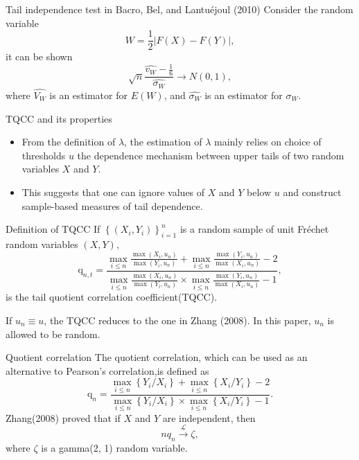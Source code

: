 \documentclass[12pt]{beamer}
\begin{document}
\begin{frame}{Tail independence test in Bacro, Bel, and Lantuéjoul (2010)}
Consider the random variable 
\begin{displaymath}
W=\frac{1}{2}|F(X)-F(Y)|,
\end{displaymath}
it can be shown
$$\sqrt{n} \frac{\widehat{v_{W}}-\frac{1}{6}}{\widehat{\sigma_{W}}}\rightarrow  N(0,1),$$
where $\widehat{V_W}$ is an estimator for $E(W)$, and 
$\widehat{\sigma_W}$ is an estimator for $\sigma_W$. 
\end{frame}

\begin{frame}{TQCC and its properties}
\begin{itemize}
\item From the definition of $\lambda$, the estimation of $\lambda$ mainly relies on choice of thresholds $u$ the dependence mechanism between upper tails of
two random variables $X$ and $Y$.
\vspace{3ex}
\item This suggests that one can ignore values of $X$ and $Y$ below $u$ and construct sample-based measures of tail dependence.
\end{itemize}

\end{frame}


\begin{frame}{Definition of TQCC}
If $\left\{\left(X_{i}, Y_{i}\right)\right\}_{i=1}^{n}$ is a random sample of unit Fréchet random variables $(X,Y)$,
\begin{displaymath}
\mathrm{q}_{n, t}=\frac{\max _{i \leq n} \frac{\max \left(X_{i}, u_n\right)}{\max \left(Y_{i},u_n\right)}+\max _{i \leq n} \frac{\max \left(Y_{i}, u_n\right)}{\max \left(X_{i}, u_n\right)}-2}{\max _{i \leq n} \frac{\max \left(X_{i},u_n\right)}{\max \left(Y_{i}, u_n\right)} \times \max _{i \leq n} \frac{\max \left(Y_{i}, u_n\right)}{\max \left(X_{i}, u_n\right)}-1},
\end{displaymath}
is the tail quotient correlation coefficient(TQCC).

If $u_{n} \equiv u$, the TQCC reduces to the one in Zhang (2008). In this paper, $u_n$ is allowed to be random.
\end{frame}


\begin{frame}{Quotient correlation}
The quotient correlation, which can be used as an alternative to Pearson's correlation,is defined as 
\begin{displaymath}
\mathrm{q}_{n}=\frac{\max _{i \leq n}\left\{Y_{i} / X_{i}\right\}+\max _{i \leq n}\left\{X_{i} / Y_{i}\right\}-2}{\max _{i \leq n}\left\{Y_{i} / X_{i}\right\} \times \max _{i \leq n}\left\{X_{i} / Y_{i}\right\}-1}.
\end{displaymath}
Zhang(2008) proved that if $X$ and $Y$ are independent, then
\begin{displaymath}
n q_{n} \stackrel{\mathcal{L}}{\longrightarrow} \zeta,
\end{displaymath}
where $\zeta$ is a gamma(2, 1) random variable.
\end{frame}
\end{document}
